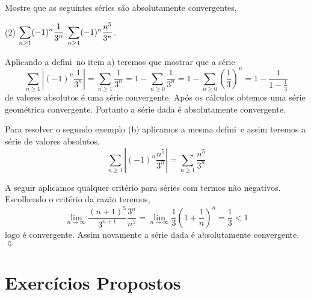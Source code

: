 \begin{exer}
Mostre que as seguintes s\'{e}ries s\~{a}o absolutamente convergentes,
\begin{tasks}[label=(\alph*),item-indent=6em,label-width=4ex,ref=(\alph*)](2)
\task  \(\displaystyle \sum_{n\ge 1}(-1)^n\frac{1}{3^n} \)
\task  \(\displaystyle \sum_{n\ge 1}(-1)^n\frac{n^5}{3^n}\).
\end{tasks}
\end{exer}

\solo Aplicando a defini\cao\ no item a) teremos que mostrar que a s\'{e}rie
\begin{equation*}
    \sum_{n\ge 1}\left|(-1)^n\frac{1}{3^n} \right|=\sum_{n\ge
    1}\frac{1}{3^n}=1-\sum_{n\ge 0}\frac{1}{3^n}=1-\sum_{n\ge
    0}\left(\frac{1}{3}\right)^n=1-\frac{1}{1-\frac{1}{3}}
\end{equation*}
de valores absolutos \'{e} uma s\'{e}rie convergente. Ap\'{o}s os c\'{a}lculos
obtemos uma s\'{e}rie geom\'{e}trica convergente. Portanto a s\'{e}rie dada \'{e}
absolutamente convergente.

Para resolver o segundo exemplo (b) aplicamos a mesma defini\cao\ e
assim teremos a s\'{e}rie de valores absolutos,
\begin{equation*}
    \sum_{n\ge 1}\left|(-1)^n\frac{n^5}{3^n} \right|= \sum_{n\ge 1}\frac{n^5}{3^n}
\end{equation*}

A seguir aplicamos qualquer crit\'{e}rio para s\'{e}ries com termos n\~{a}o
negativos. Escolhendo o crit\'{e}rio da raz\~{a}o teremos,
\begin{equation*}
    \lim_{n\to \infty}\frac{(n+1)^5}{3^{n+1}}\frac{3^n}{n^5}=\lim_{n\to
    \infty}\frac{1}{3}\left(1+\frac{1}{n}\right)^n=\frac{1}{3}<1
\end{equation*}
logo \'{e} convergente. Assim novamente a s\'{e}rie dada \'{e} absolutamente
convergente. \hfill \(\lozenge\)

\section*{Exercícios Propostos} 

